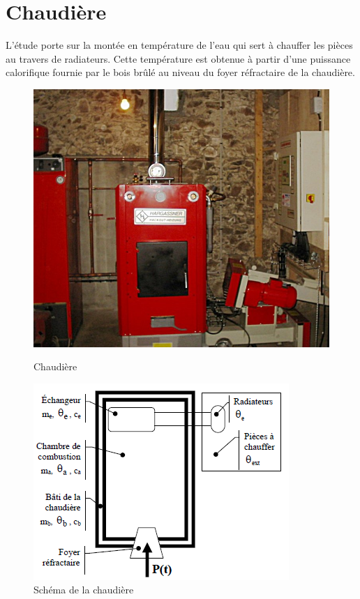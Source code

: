 \newpage

\section{Chaudière}

L'étude porte sur la montée en température de l'eau qui sert à chauffer les pièces au travers de radiateurs. Cette température est obtenue à partir d'une puissance calorifique fournie par le bois brûlé au niveau du foyer réfractaire de la chaudière.

\begin{figure}[htbp]
\begin{minipage}[c]{.48\linewidth}	
\begin{center}
\includegraphics[width=0.7\linewidth]{img/chaudiere.png}
\caption{Chaudière}
\label{fig:image12}
\end{center}
\end{minipage}
\hfill
\begin{minipage}[c]{.50\linewidth}
\begin{center}
\includegraphics[width=0.8\linewidth]{img/chaudiere2.png}
\caption{Schéma de la chaudière}
\label{fig:image13}
\end{center}
\end{minipage}
\end{figure}

